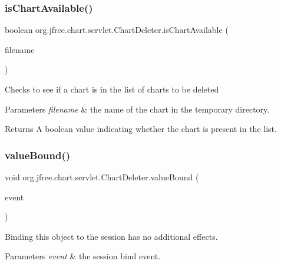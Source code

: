 \subsubsection{\texorpdfstring{is\+Chart\+Available()}{isChartAvailable()}}
{\footnotesize\ttfamily boolean org.\+jfree.\+chart.\+servlet.\+Chart\+Deleter.\+is\+Chart\+Available (\begin{DoxyParamCaption}\item[{String}]{filename }\end{DoxyParamCaption})}

Checks to see if a chart is in the list of charts to be deleted


\begin{DoxyParams}{Parameters}
{\em filename} & the name of the chart in the temporary directory.\\
\hline
\end{DoxyParams}
\begin{DoxyReturn}{Returns}
A boolean value indicating whether the chart is present in the list. 
\end{DoxyReturn}
\mbox{\label{classorg_1_1jfree_1_1chart_1_1servlet_1_1_chart_deleter_a7a48fb7bfcc51b401c0b660ca0c21bfa}} 
\subsubsection{\texorpdfstring{value\+Bound()}{valueBound()}}
{\footnotesize\ttfamily void org.\+jfree.\+chart.\+servlet.\+Chart\+Deleter.\+value\+Bound (\begin{DoxyParamCaption}\item[{Http\+Session\+Binding\+Event}]{event }\end{DoxyParamCaption})}

Binding this object to the session has no additional effects.


\begin{DoxyParams}{Parameters}
{\em event} & the session bind event. \\
\hline
\end{DoxyParams}
\mbox{\label{classorg_1_1jfree_1_1chart_1_1servlet_1_1_chart_deleter_ad8f8ac98ec6fc581b023fb7235ea2d4a}} 

